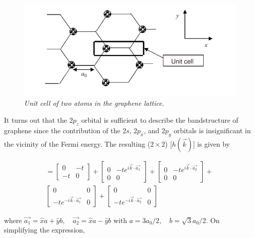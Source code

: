 \documentclass{resonance}
\begin{document}
\begin{figure}[!t]
\caption{\textit{Unit cell of two atoms in the graphene lattice.}}\label{graphene_lattice}
\vspace{4pt}
\centering
\includegraphics[scale=0.55]{graphene_lattice.png}
\end{figure}

It turns out that the 2$p_{z}$ orbital is sufficient to describe the bandstructure of graphene since the contribution of the 2$s$, 2$p_{x}$, and 2$p_{y}$ orbitals is insignificant in the vicinity of the Fermi energy. The resulting ($2 \times 2$) [$h(\vec{k})$] is given by 

\begin{align*}
    [h(\vec{k})] = 
    \begin{bmatrix}
        0 & -t \\
        -t & 0 
    \end{bmatrix} + 
    \begin{bmatrix}
        0 & -te^{i\vec{k}\cdot\vec{a_1}} \\ 
        0 & 0
    \end{bmatrix} + 
    \begin{bmatrix}
        0 & -te^{i\vec{k}\cdot\vec{a_2}} \\
        0 & 0
    \end{bmatrix} +  \\
    \begin{bmatrix}
        0 & 0 \\
        -te^{-i\vec{k}\cdot\vec{a_1}} & 0
    \end{bmatrix} + 
    \begin{bmatrix}
        0 & 0 \\
        -te^{-i\vec{k}\cdot\vec{a_2}} & 0 
    \end{bmatrix}  
\end{align*} 

where $\vec{a_1} = \hat{x}a+\hat{y}b, \quad \vec{a_2} = \hat{x}a-\hat{y}b$ with $a = 3a_{0}/2, \quad b = \sqrt{3}a_{0}/2 $. On simplifying the expression, 
\end{document}

